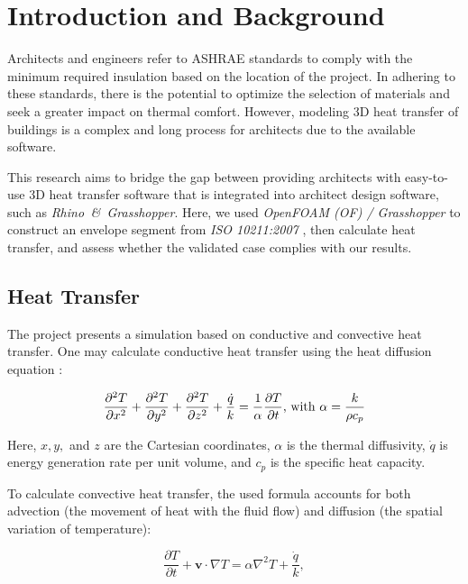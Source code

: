 \chapter{Introduction and Background}
Architects and engineers refer to ASHRAE standards to comply with the minimum required insulation based on the location of the project. 
In adhering to these standards, there is the potential to optimize the selection of materials and seek a greater impact on thermal comfort. 
However, modeling 3D heat transfer of buildings is a complex and long process for architects due to the available software. 

This research aims to bridge the gap between providing architects with easy-to-use 3D heat transfer software that is integrated into architect design software, such as \textit{Rhino\, \&\, Grasshopper}. Here, we used \textit{OpenFOAM (OF) / Grasshopper} to construct an envelope segment from \textit{ISO 10211:2007}
\cite{ISO}, then calculate heat transfer, and assess whether the validated case complies with our results. 


\section{Heat Transfer}

The project presents a simulation based on conductive and convective heat transfer. 
One may calculate conductive heat transfer using the heat diffusion equation \cite{bergman2011fundamentals}:
	
	\begin{equation} 
	\frac{\partial^2 T}{\partial x^2}+
	\frac{\partial^2 T}{\partial y^2}+
	\frac{\partial^2 T}{\partial z^2}+ 
	\frac{\dot{q}}{k}= \frac{1}{\alpha}\frac{\partial T}{\partial t} \text{, with } \alpha = \frac{k}{\rho c_p}\quad \\
	\end{equation}
	
	
Here, $x,y,$ and $z$ are the Cartesian coordinates, $\alpha$ is the thermal diffusivity, $\dot{q}$ is energy generation rate per unit volume, and $c_p$ is the specific heat capacity.
 
To calculate convective heat transfer, the used formula accounts for both advection (the movement of heat with the fluid flow) and diffusion (the spatial variation of temperature): 

\begin{equation}
    \frac{\partial T}{\partial t} + \mathbf{v} \cdot \nabla T = \alpha \nabla^2 T + \frac{\dot{q}}{k},
\end{equation}

